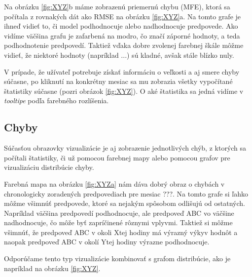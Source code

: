 Na obrázku \ref{fig:XYZ}b máme zobrazenú priemernú chybu (MFE), ktorá sa počítala z rovnakých dát ako RMSE na obrázku \ref{fig:XYZ}a. Na tomto grafe je ihneď vidieť to, či model podhodnocuje alebo nadhodnocuje predpovede. Ako vidíme väčšina grafu je zafarbená na modro, čo značí záporné hodnoty, a teda podhodnotenie predpovedí. Taktiež vďaka dobre zvolenej farebnej škále môžme vidieť, že niektoré hodnoty (napríklad ...) sú kladné, avšak stále blízko nuly.

V prípade, že užívateľ potrebuje získať informáciu o veľkosti a aj smere chyby súčasne, po kliknutí na konkrétny mesiac sa mu zobrazia všetky vypočítané štatistiky súčasne (pozri obrázok \ref{fig:XYZ}). O aké štatistika sa jedná vidíme v \textit{tooltipe} podľa farebného rozlíšenia.

\subsection{Chyby}

Súčasťou obrazovky vizualizácie je aj zobrazenie jednotlivých chýb, z ktorých sa počítali štatistiky, či už pomocou farebnej mapy alebo pomocou grafov pre vizualizáciu distribúcie chyby.

Farebná mapa na obrázku \ref{fig:XYZa} nám dáva dobrý obraz o chybách v chronologicky zoradených predpovediach pre mesiac ???. Na tomto grafe si ľahko môžme všimnúť predpovede, ktoré sa nejakým spôsobom odlišujú od ostatných. Napríklad väčšina predpovedí podhodnocuje, ale predpoveď ABC vo väčšine nadhodnocuje, čo môže byť zapríčinené rôznymi vplyvmi. Taktiež si môžme všimnúť, že predpoveď ABC v okoli Xtej hodiny má výrazný výkyv hodnôt a naopak predpoveď ABC v okolí Ytej hodiny výrazne podhodnocuje.

Odporúčame tento typ vizualizácie kombinovať s grafom distribúcie, ako je napríklad na obrázku \ref{fig:XYZ}.


  

